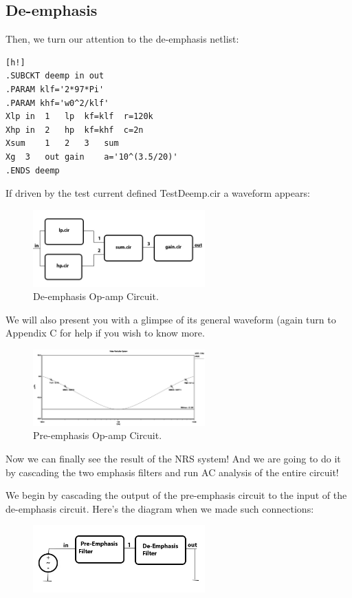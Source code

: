 \documentclass[a4paper]{IEEEtran}
\begin{document}
	\subsection{De-emphasis}
		Then, we turn our attention to the de-emphasis netlist:
		\begin{center}
		\begin{lstlisting}[caption=De-emphasis netlist.][h!]
.SUBCKT deemp in out
.PARAM klf='2*97*Pi'
.PARAM khf='w0^2/klf'
Xlp	in	1	lp	kf=klf	r=120k
Xhp	in	2	hp	kf=khf	c=2n
Xsum	1	2	3	sum
Xg	3	out	gain	a='10^(3.5/20)'
.ENDS deemp
		\end{lstlisting}
		\end{center}
		If driven by the test current defined TestDeemp.cir a waveform appears:
		\begin{figure}[h!]
			\label{deemp.cir}
			\includegraphics[width=250px]{deemp-sim.jpg}
			\caption{De-emphasis Op-amp Circuit.}
		\end{figure}
		
		We will also present you with a glimpse of its general waveform (again turn to Appendix C for help if you wish to know more.
		\begin{figure}[h!]
			\label{deepm-plot.cir}
			\includegraphics[width=250px]{deemp_plot.eps}
			\caption{Pre-emphasis Op-amp Circuit.}
		\end{figure}
		\newpage
	Now we can finally see the result of the NRS system! And we are going to do it by cascading the two emphasis filters and run AC analysis of the entire circuit!
	
	We begin by cascading the output of the pre-emphasis circuit to the input of the de-emphasis circuit. Here's the diagram when we made such connections:
	\begin{figure}[h!]
		\label{nrs.cir}
		\begin{center}
			\includegraphics[width=250px]{nrs.jpg}
		\end{center}
	\end{figure}
	
\end{document}

